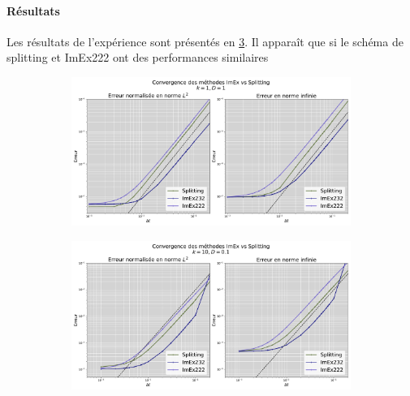     \paragraph{Résultats}
    Les résultats de l'expérience sont présentés en \ref{fig:imex_vs_splitting}. Il apparaît que si le schéma de splitting et ImEx222 ont des performances similaires
    \begin{figure}[ht!]
        \centering
        \begin{subfigure}{\textwidth}
            \centering
            \includegraphics[width=\linewidth]{media/4_travail/2_nagumo/convergence/ImEx_vs_splitting_k1_D1.pdf}
            \caption{} %
            \label{fig:imex_k1_d1}
        \end{subfigure}
    \begin{subfigure}{\textwidth}
        \centering
        \includegraphics[width=\linewidth]{media/4_travail/2_nagumo/convergence/ImEx_vs_splitting_k10_D0.1.pdf}
        \caption{} %
        \label{fig:imex_k10_d01}
    \end{subfigure}
    \caption{} %
    \label{fig:imex_vs_splitting}
    \end{figure}
\newpage
